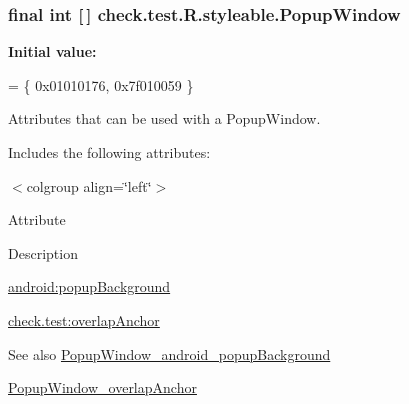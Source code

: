 \subsubsection[{Popup\+Window}]{\setlength{\rightskip}{0pt plus 5cm}final int \mbox{[}$\,$\mbox{]} check.\+test.\+R.\+styleable.\+Popup\+Window\hspace{0.3cm}{\ttfamily [static]}}\label{classcheck_1_1test_1_1_r_1_1styleable_a288d8e82cd6f78d38522b3bd6c8acc55}
{\bfseries Initial value\+:}
\begin{DoxyCode}
= \{
            0x01010176, 0x7f010059
        \}
\end{DoxyCode}
Attributes that can be used with a Popup\+Window. 

Includes the following attributes\+:

\begin{TabularC}{0}
\hline
\end{TabularC}
$<$colgroup align=\char`\"{}left\char`\"{}$>$ 

Attribute

Description 

{\ttfamily \hyperlink{classcheck_1_1test_1_1_r_1_1styleable_ad1f620b82190cd4dec8ccbeb3d2904c7}{android\+:popup\+Background}}

{\ttfamily \hyperlink{classcheck_1_1test_1_1_r_1_1styleable_aeff228e6915165337ceeae75105f3722}{check.\+test\+:overlap\+Anchor}}

\begin{DoxySeeAlso}{See also}
\hyperlink{classcheck_1_1test_1_1_r_1_1styleable_ad1f620b82190cd4dec8ccbeb3d2904c7}{Popup\+Window\+\_\+android\+\_\+popup\+Background} 

\hyperlink{classcheck_1_1test_1_1_r_1_1styleable_aeff228e6915165337ceeae75105f3722}{Popup\+Window\+\_\+overlap\+Anchor} 
\end{DoxySeeAlso}
\hypertarget{classcheck_1_1test_1_1_r_1_1styleable_ad1f620b82190cd4dec8ccbeb3d2904c7}{}
